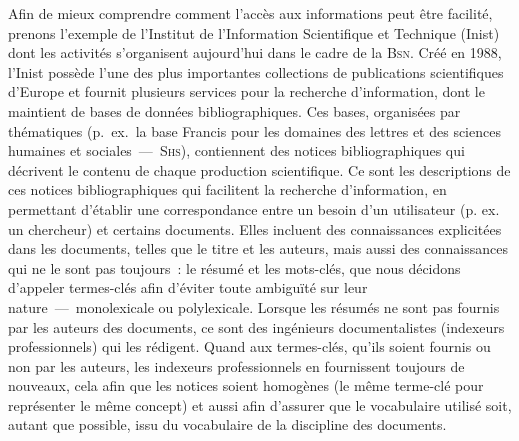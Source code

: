       Afin de mieux comprendre comment l'accès aux informations peut être
      facilité, prenons l'exemple de l'Institut de l'Information Scientifique et
      Technique (Inist) dont les activités s'organisent aujourd'hui dans le
      cadre de la \textsc{Bsn}. Créé en 1988, l'Inist possède l'une des plus
      importantes collections de publications scientifiques d'Europe et fournit
      plusieurs services pour la recherche d'information, dont le maintient de
      bases de données bibliographiques. Ces bases, organisées par thématiques
      (p.~ex.~la base Francis pour les domaines des lettres et des sciences
      humaines et sociales~---~\textsc{Shs}), contiennent des notices
      bibliographiques qui décrivent le contenu de chaque production
      scientifique. Ce sont les descriptions de ces notices bibliographiques qui
      facilitent la recherche d'information, en permettant d'établir une
      correspondance entre un besoin d'un utilisateur (p. ex. un chercheur) et
      certains documents. Elles incluent des connaissances explicitées dans les
      documents, telles que le titre et les auteurs, mais aussi des
      connaissances qui ne le sont pas toujours~: le résumé et les mots-clés,
      que nous décidons d'appeler termes-clés afin d'éviter toute ambiguïté sur
      leur nature~---~monolexicale ou polylexicale. Lorsque les résumés ne sont
      pas fournis par les auteurs des documents, ce sont des ingénieurs
      documentalistes (indexeurs professionnels) qui les rédigent. Quand aux
      termes-clés, qu'ils soient fournis ou non par les auteurs, les indexeurs
      professionnels en fournissent toujours de nouveaux, cela afin que les
      notices soient homogènes (le même terme-clé pour représenter le même
      concept) et aussi afin d'assurer que le vocabulaire utilisé soit, autant
      que possible, issu du vocabulaire de la discipline des documents.

